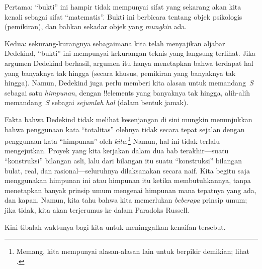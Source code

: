 \documentclass[../../../include/open-logic-section]{subfiles}
\begin{document}
Pertama: ``bukti'' ini hampir tidak mempunyai sifat yang sekarang akan kita
kenali sebagai sifat ``matematis''. Bukti ini berbicara tentang objek
psikologis (pemikiran), dan bahkan sekadar objek yang \emph{mungkin} ada.

Kedua: sekurang-kurangnya sebagaimana kita telah menyajikan aljabar Dedekind,
``bukti'' ini mempunyai kekurangan teknis yang langsung terlihat. Jika
argumen Dedekind berhasil, argumen itu hanya menetapkan bahwa terdapat hal
yang banyaknya tak hingga (secara khusus, pemikiran yang banyaknya tak
hingga). Namun, Dedekind juga perlu memberi kita alasan untuk memandang~$S$
sebagai satu \emph{himpunan}, dengan !!{element}s yang banyaknya tak hingga,
alih-alih memandang~$S$ sebagai \emph{sejumlah hal} (dalam bentuk jamak).

Fakta bahwa Dedekind tidak melihat kesenjangan di sini mungkin menunjukkan
bahwa penggunaan kata ``totalitas'' olehnya tidak secara tepat sejalan
dengan penggunaan kata ``himpunan'' oleh \emph{kita}.\footnote{Memang, kita
mempunyai alasan-alasan lain untuk berpikir demikian; lihat
\citet[p.~23]{Potter2004}.} Namun, hal ini tidak terlalu mengejutkan. Proyek
yang kita kerjakan dalam dua bab terakhir---suatu ``konstruksi'' bilangan
asli, lalu dari bilangan itu suatu ``konstruksi'' bilangan bulat, real, dan
rasional---seluruhnya dilaksanakan secara naif. Kita begitu saja menggunakan
himpunan ini atau himpunan itu ketika membutuhkannya, tanpa menetapkan banyak
prinsip umum mengenai himpunan mana tepatnya yang ada, dan kapan. Namun, kita
tahu bahwa kita memerlukan \emph{beberapa} prinsip umum; jika tidak, kita
akan terjerumus ke dalam Paradoks Russell.

Kini tibalah waktunya bagi kita untuk meninggalkan kenaifan tersebut.
\end{document}
